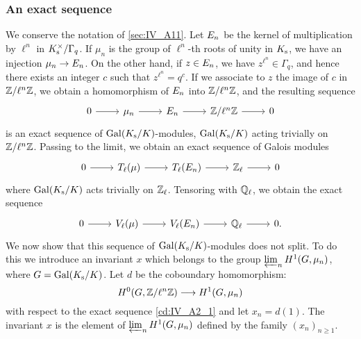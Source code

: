 \begin{subappendices}
\subsubsection{An exact sequence}
\label{sec:IV_A12}
We conserve the notation of \ref{sec:IV_A11}.
\dpage
Let ${E}_{n}$ be the kernel of multiplication by $\ell^n$ in $K_{\mathrm{s}}^\times/\Gamma_q$. If $\mu_n$ is the group of $\ell^n$-th roots of unity in
$K_{\mathrm{s}}$, we have an injection $\mu_n \to {E}_{n}$. On the other hand, if
$z \in {E}_{n}$, we have $z^{\ell^n} \in \Gamma_q$, and hence there exists
an integer $c$ such that $z^{\ell^n} = q^c$. If we associate to $z$ the image
of $c$ in $\mathbb{Z}/\ell^n\mathbb{Z}$, we obtain a homomorphism of ${E}_{n}$ into
$\mathbb{Z}/\ell^n\mathbb{Z}$, and the resulting sequence
\begin{equation}
	\begin{tikzcd}
		0 \rar & \mu_n \rar & \tors{E}{n} \rar & \Z/\ell^n\Z \rar & 0
	\end{tikzcd}
	\label{cd:IV_A2_1}
\end{equation}
is an exact sequence of $\operatorname{Gal}(K_{\mathrm{s}}/K)$-modules, $\operatorname{Gal}(K_{\mathrm{s}}/K)$ acting
trivially on $\mathbb{Z}/\ell^n\mathbb{Z}$. Passing to the limit, we obtain an exact sequence
of Galois modules
\begin{equation}
	\begin{tikzcd}
		0 \rar & T_\ell(\mu) \rar & T_\ell(\tors{E}{n}) \rar & \Z_\ell
		\rar & 0
	\end{tikzcd}
\end{equation}
where $\operatorname{Gal}(K_{\mathrm{s}}/K)$ acts trivially on $\mathbb{Z}_\ell$. Tensoring with $\mathbb{Q}_\ell$, we
obtain the exact sequence
\begin{equation}
	\begin{tikzcd}
		0 \rar & V_\ell(\mu) \rar & V_\ell(\tors{E}{n}) \rar & \Q_\ell
		\rar & 0.
	\end{tikzcd}
	\label{cd:IV_A2_3}
\end{equation}
We now show that this sequence of $\operatorname{Gal}(K_{\mathrm{s}}/K)$-modules does not split. To
do this we introduce an invariant $x$ which belongs to the group $\varprojlim_n
H^1(G, \mu_n)$, where $G = \operatorname{Gal}(K_{\mathrm{s}}/K)$. Let $d$ be the coboundary
homomorphism:
\[
	H^0(G, \mathbb{Z}/\ell^n\mathbb{Z}) \longrightarrow H^1(G, \mu_n)
\]
\dpage
with respect to the exact sequence \eqref{cd:IV_A2_1} and let $x_n = d(1)$. The
invariant $x$ is the element of $\varprojlim_n H^1(G, \mu_n)$ defined by the family
$(x_n)_{n \ge 1}$.


\end{subappendices}
